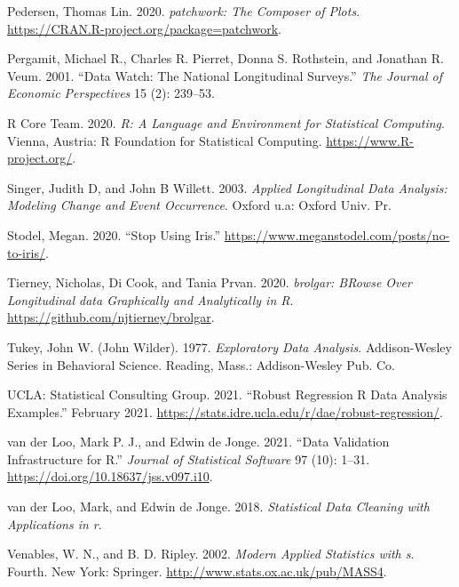 \documentclass{article}
\newlength{\cslhangindent}
\newlength{\cslentryspacingunit} %
\newenvironment{CSLReferences}[2] %
 {%
  \setlength{\parindent}{0pt}
  \ifodd #1
  \let\oldpar\par
  \def\par{\hangindent=\cslhangindent\oldpar}
  \fi
  \setlength{\parskip}{#2\cslentryspacingunit}
 }%
 {}
\begin{document}
\begin{CSLReferences}{1}{0}
\leavevmode{}%
Pedersen, Thomas Lin. 2020. \emph{{patchwork: The Composer of Plots}}. \url{https://CRAN.R-project.org/package=patchwork}.

\leavevmode{}%
Pergamit, Michael R., Charles R. Pierret, Donna S. Rothstein, and Jonathan R. Veum. 2001. {``Data Watch: The National Longitudinal Surveys.''} \emph{The Journal of Economic Perspectives} 15 (2): 239--53.

\leavevmode{}%
R Core Team. 2020. \emph{R: A Language and Environment for Statistical Computing}. Vienna, Austria: R Foundation for Statistical Computing. \url{https://www.R-project.org/}.

\leavevmode{}%
Singer, Judith D, and John B Willett. 2003. \emph{Applied Longitudinal Data Analysis: Modeling Change and Event Occurrence}. Oxford u.a: Oxford Univ. Pr.

\leavevmode{}%
Stodel, Megan. 2020. {``Stop Using Iris.''} \url{https://www.meganstodel.com/posts/no-to-iris/}.

\leavevmode{}%
Tierney, Nicholas, Di Cook, and Tania Prvan. 2020. \emph{{brolgar: BRowse Over Longitudinal data Graphically and Analytically in R}}. \url{https://github.com/njtierney/brolgar}.

\leavevmode{}%
Tukey, John W. (John Wilder). 1977. \emph{Exploratory Data Analysis}. Addison-Wesley Series in Behavioral Science. Reading, Mass.: Addison-Wesley Pub. Co.

\leavevmode{}%
UCLA: Statistical Consulting Group. 2021. {``{Robust Regression \textbar{} R Data Analysis Examples}.''} February 2021. \url{https://stats.idre.ucla.edu/r/dae/robust-regression/}.

\leavevmode{}%
van der Loo, Mark P. J., and Edwin de Jonge. 2021. {``Data Validation Infrastructure for {R}.''} \emph{Journal of Statistical Software} 97 (10): 1--31. \url{https://doi.org/10.18637/jss.v097.i10}.

\leavevmode{}%
van der Loo, Mark, and Edwin de Jonge. 2018. \emph{Statistical Data Cleaning with Applications in r}.

\leavevmode{}%
Venables, W. N., and B. D. Ripley. 2002. \emph{Modern Applied Statistics with s}. Fourth. New York: Springer. \url{http://www.stats.ox.ac.uk/pub/MASS4}.


\end{CSLReferences}
\end{document}
